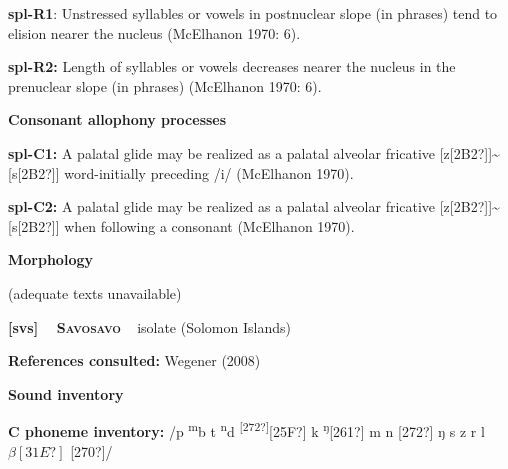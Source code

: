 \begin{styleBody}
\textbf{spl-R1}: Unstressed syllables or vowels in postnuclear slope (in phrases) tend to elision nearer the nucleus (McElhanon 1970: 6).
\end{styleBody}

\begin{styleBody}
\textbf{spl-R2: }Length of syllables or vowels decreases nearer the nucleus in the prenuclear slope (in phrases) (McElhanon 1970: 6).
\end{styleBody}

\begin{styleBody}
\textbf{Consonant allophony processes}
\end{styleBody}

\begin{styleBody}
\textbf{spl-C1: }A palatal glide may be realized as a palatal alveolar fricative [z[2B2?]]\~{}[s[2B2?]] word-initially preceding /i/ (McElhanon 1970).
\end{styleBody}

\begin{styleBody}
\textbf{spl-C2: }A palatal glide may be realized as a palatal alveolar fricative [z[2B2?]]\~{}[s[2B2?]] when following a consonant (McElhanon 1970).
\end{styleBody}

\begin{styleBody}
\textbf{Morphology}
\end{styleBody}

\begin{styleBody}
(adequate texts unavailable)
\end{styleBody}

\clearpage\begin{styleBody}
\textbf{[svs] }\ \ \textbf{\textsc{Savosavo}}\textbf{\ \ }isolate (Solomon Islands)
\end{styleBody}

\begin{styleBody}
\textbf{References consulted: }Wegener (2008)
\end{styleBody}

\begin{styleBody}
\textbf{Sound inventory}
\end{styleBody}

\begin{styleBody}
\textbf{C phoneme inventory:} /p \textsuperscript{m}b t \textsuperscript{n}d \textsuperscript{[272?]}[25F?] k \textsuperscript{ŋ}[261?] m n [272?] ŋ s z r l $\beta [31E?]$ [270?]/
\end{styleBody}

